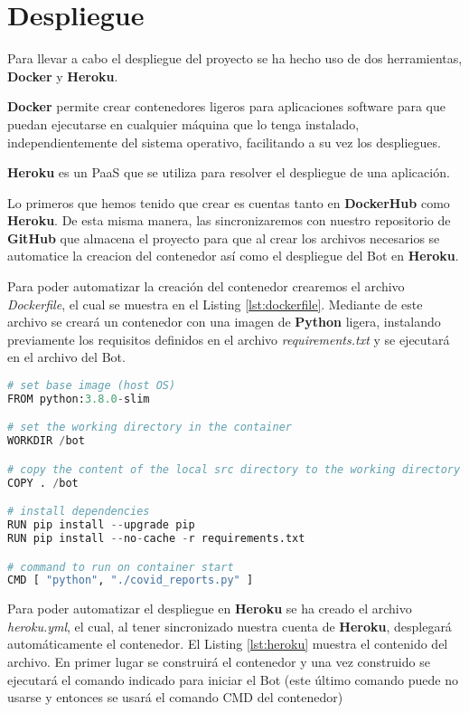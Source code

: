 \section{Despliegue}

Para llevar a cabo el despliegue del proyecto se ha hecho uso de dos herramientas, \textbf{Docker} y \textbf{Heroku}.

\textbf{Docker} permite crear contenedores ligeros para aplicaciones software para que puedan ejecutarse en cualquier máquina que lo tenga instalado, independientemente del sistema operativo, facilitando a su vez los despliegues.

\textbf{Heroku} es un PaaS que se utiliza para resolver el despliegue de una aplicación.

Lo primeros que hemos tenido que crear es cuentas tanto en \textbf{DockerHub} como \textbf{Heroku}. De esta misma manera, las sincronizaremos con nuestro repositorio de \textbf{GitHub} que almacena el proyecto para que al crear los archivos necesarios se automatice la creacion del contenedor así como el despliegue del Bot en \textbf{Heroku}.

Para poder automatizar la creación del contenedor crearemos el archivo \textit{Dockerfile}, el cual se muestra en el Listing \ref{lst:dockerfile}. Mediante de este archivo se creará un contenedor con una imagen de \textbf{Python} ligera, instalando previamente los requisitos definidos en el archivo \textit{requirements.txt} y se ejecutará en el archivo del Bot.

\begin{lstlisting}[language=Python, caption={Archivo Dockerfile.}, label={lst:dockerfile}]
# set base image (host OS)
FROM python:3.8.0-slim

# set the working directory in the container
WORKDIR /bot

# copy the content of the local src directory to the working directory
COPY . /bot

# install dependencies
RUN pip install --upgrade pip
RUN pip install --no-cache -r requirements.txt

# command to run on container start
CMD [ "python", "./covid_reports.py" ]
\end{lstlisting}

Para poder automatizar el despliegue en \textbf{Heroku} se ha creado el archivo \textit{heroku.yml}, el cual, al tener sincronizado nuestra cuenta de \textbf{Heroku}, desplegará automáticamente el contenedor. El Listing \ref{lst:heroku} muestra el contenido del archivo. En primer lugar se construirá el contenedor y una vez construido se ejecutará el comando indicado para iniciar el Bot (este último comando puede no usarse y entonces se usará el comando CMD del contenedor)

